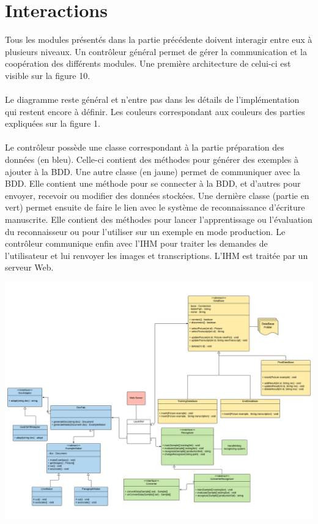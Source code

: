 \section{Interactions}

Tous les modules présentés dans la partie précédente doivent interagir entre eux à plusieurs niveaux. Un contrôleur général permet de gérer la communication et la coopération des différents modules. Une première architecture de celui-ci est visible sur la figure 10.

\paragraph{}
Le diagramme reste général et n’entre pas dans les détails de l’implémentation qui restent encore à définir. Les couleurs correspondant aux couleurs des parties expliquées sur la figure 1.

\paragraph{}
Le contrôleur possède une classe correspondant à la partie préparation des données (en bleu). Celle-ci contient des méthodes pour générer des exemples à ajouter à la BDD. Une autre classe (en jaune) permet de communiquer avec la BDD. Elle contient une méthode pour se connecter à la BDD, et d’autres pour envoyer, recevoir ou modifier des données stockées. Une dernière classe (partie en vert) permet ensuite de faire le lien avec le système de reconnaissance d’écriture manuscrite. Elle contient des méthodes pour lancer l’apprentissage ou l’évaluation du reconnaisseur ou pour l’utiliser sur un exemple en mode production.
Le contrôleur communique enfin avec l’IHM pour traiter les demandes de l’utilisateur et lui renvoyer les images et transcriptions. L’IHM est traitée par un serveur Web.

\newpage

\begin{mdframed}[frametitle={Figure 11 : Diagramme de classes du contrôleur}, innerbottommargin=10]
\begin{center}
\includegraphics[scale=0.25]{Specifications.pdf}
\end{center}
\end{mdframed}

